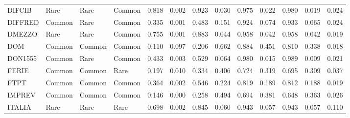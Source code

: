 \begin{tiny}
\begin{longtable}{|l|l|l|l|r|r|r|r|r|r|r|r|r|}
    DIFCIB &            Rare &                         Rare &         Common &          0.818 &   0.002 &                    0.923 &                  0.030 &                  0.975 &                  0.022 &                  0.980 &                  0.019 &              0.024 \\
    DIFFRED &          Common &                         Rare &         Common &          0.335 &   0.001 &                    0.483 &                  0.151 &                  0.924 &                  0.074 &                  0.933 &                  0.065 &              0.024 \\
    DMEZZO &            Rare &                         Rare &         Common &          0.755 &   0.001 &                    0.883 &                  0.044 &                  0.958 &                  0.042 &                  0.958 &                  0.042 &              0.019 \\
    DOM &          Common &                       Common &         Common &          0.110 &   0.097 &                    0.206 &                  0.662 &                  0.884 &                  0.451 &                  0.810 &                  0.338 &              0.018 \\
    DON1555 &          Common &                         Rare &         Common &          0.433 &   0.003 &                    0.529 &                  0.064 &                  0.980 &                  0.015 &                  0.989 &                  0.009 &              0.021 \\
    FERIE &          Common &                       Common &           Rare &          0.197 &   0.010 &                    0.334 &                  0.406 &                  0.724 &                  0.319 &                  0.695 &                  0.309 &              0.037 \\
    FTPT &          Common &                       Common &         Common &          0.364 &   0.002 &                    0.546 &                  0.224 &                  0.819 &                  0.189 &                  0.812 &                  0.188 &              0.019 \\
    IMPREV &          Common &                       Common &         Common &          0.146 &   0.000 &                    0.258 &                  0.494 &                  0.694 &                  0.381 &                  0.648 &                  0.363 &              0.026 \\
    \rowcolor{Kol2023}
    ITALIA &            Rare &                         Rare &           Rare &          0.698 &   0.002 &                    0.845 &                  0.060 &                  0.943 &                  0.057 &                  0.943 &                  0.057 &              0.110 \\

\end{longtable}
\end{tiny}
